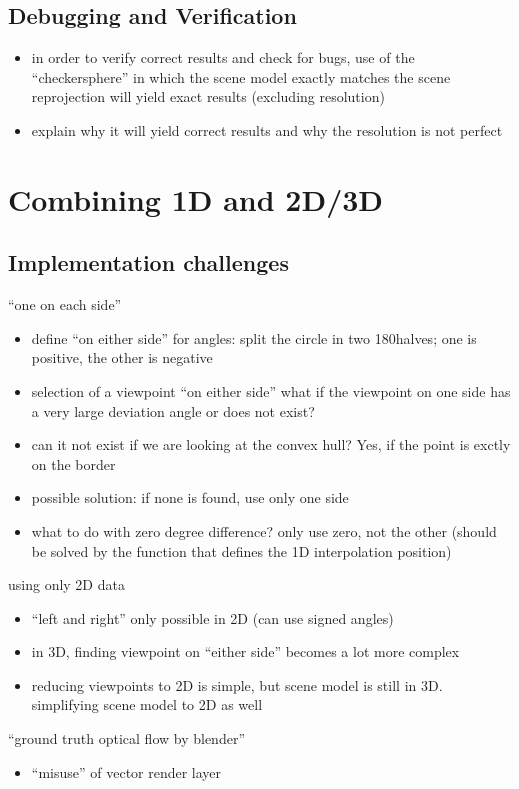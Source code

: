 \subsection{Debugging and Verification}
\begin{itemize}
  \item in order to verify correct results and check for bugs, use of the ``checkersphere'' in which the scene model exactly matches the scene \ar reprojection will yield exact results (excluding resolution)
  \item explain why it will yield correct results and why the resolution is not perfect
\end{itemize}

\section{Combining 1D and 2D/3D}
\subsection{Implementation challenges}
``one on each side''
\begin{itemize}
  \item define ``on either side'' for angles: split the circle in two 180\degree halves; one is positive, the other is negative
  \item selection of a viewpoint ``on either side'' \ar what if the viewpoint on one side has a very large deviation angle or does not exist?
  \item can it not exist if we are looking at the convex hull? Yes, if the point is exctly on the border
  \item possible solution: if none is found, use only one side
  \item what to do with zero degree difference? \ar only use zero, not the other (should be solved by the function that defines the 1D interpolation position)
\end{itemize}
using only 2D data
\begin{itemize}
  \item ``left and right'' only possible in 2D (can use signed angles)
  \item in 3D, finding viewpoint on ``either side'' becomes a lot more complex
  \item reducing viewpoints to 2D is simple, but scene model is still in 3D. simplifying scene model to 2D as well
\end{itemize}
``ground truth optical flow by blender''
\begin{itemize}
  \item ``misuse'' of vector render layer
\end{itemize}
